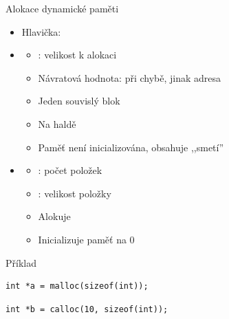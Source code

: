 \begin{frame}[fragile]{Alokace dynamické paměti}

  \begin{itemize}
    \item Hlavička: 

    \pause

    \item {}
    \begin{itemize}
      \item {}: velikost k alokaci
      \item Návratová hodnota:  při chybě, jinak adresa

      \pause

      \item Jeden souvislý blok
      \item Na haldě
      \item Paměť není inicializována, obsahuje ,,smetí''
    \end{itemize}

    \pause

    \item {}
    \begin{itemize}
      \item {}: počet položek
      \item {}: velikost položky
      \item Alokuje 

      \pause

      \item Inicializuje paměť na 0
    \end{itemize}
  \end{itemize}


  \begin{block}{Příklad}
    \begin{lstlisting}[belowskip=0pt]
int *a = malloc(sizeof(int));
    \end{lstlisting}
    \begin{lstlisting}[aboveskip=0pt]
int *b = calloc(10, sizeof(int));
    \end{lstlisting}
  \end{block}

\end{frame}

